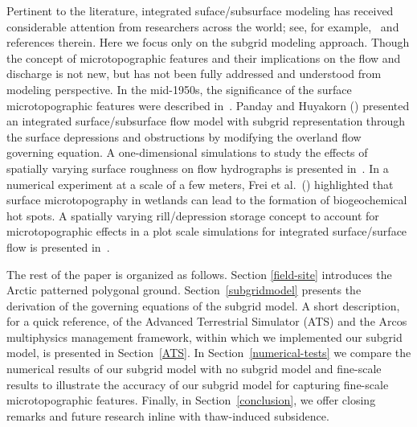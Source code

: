 \documentclass[review,11pt]{elsarticle}
\begin{document}

Pertinent to the literature, integrated suface/subsurface modeling has received considerable attention from researchers across the world; see, for example,~\cite{painter2013modeling,kurylyk2014climate,spainter2016integrated} and references therein. Here we focus only on the subgrid modeling approach. Though the concept of microtopographic features and their implications on the flow and discharge is not new, but has not been fully addressed and understood from modeling perspective. 
In the mid-1950s, the significance of the surface microtopographic features were described in~\cite{stammers1956effect}. Panday and Huyakorn (\citeyear{panday2004fully}) presented an integrated surface/subsurface flow model with subgrid representation through the surface depressions and obstructions by modifying the overland flow governing equation. A one-dimensional simulations to study the effects of spatially varying surface roughness on flow hydrographs is presented in~\cite{huang2009influences}. In a numerical experiment at a scale of a few meters, Frei et al.~(\citeyear{frei2012surface}) highlighted that surface microtopography in wetlands can lead to the formation of biogeochemical hot spots. A spatially varying rill/depression storage concept to account for microtopographic effects in a plot scale simulations for integrated surface/surface flow is presented in~\cite{frei2014representing}.

The rest of the paper is organized as follows. Section \ref{field-site} introduces the Arctic patterned polygonal ground. Section~\ref{subgridmodel} presents the derivation of the governing equations of the subgrid model. A short description, for a quick reference, of the Advanced Terrestrial Simulator (ATS) and the Arcos multiphysics management framework, within which we implemented our subgrid model, is presented in Section~\ref{ATS}. In Section~\ref{numerical-tests} we compare the numerical results of our subgrid model with no subgrid model and fine-scale results to illustrate the accuracy of our subgrid model for capturing fine-scale microtopographic features. Finally, in Section~\ref{conclusion}, we offer closing remarks and future research inline with thaw-induced subsidence.
\end{document}
